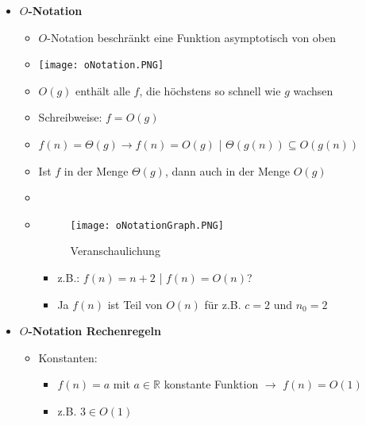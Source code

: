 \begin{itemize}
        \item \textbf{$O$-Notation}
            \begin{itemize}
                \item $O$-Notation beschränkt eine Funktion asymptotisch von oben
                \item[] \texttt{[image: oNotation.PNG]}
                \item $O(g)$ enthält alle $f$, die höchstens so schnell wie $g$ wachsen
                \item Schreibweise: $f=O(g)$
                \item $f(n)=\Theta(g) \rightarrow f(n) = O(g)$ | $\Theta(g(n)) \subseteq O(g(n))$
                \item Ist $f$ in der Menge $\Theta(g)$, dann auch in der Menge $O(g)$
                \item[]
                \item[] 
                    \begin{minipage}{0.3\textwidth}
                    \begin{figure}[H]
                        \centering
                        \texttt{[image: oNotationGraph.PNG]}
                        \caption{Veranschaulichung}
                        \label{}
                    \end{figure}
                    \end{minipage}
                    \begin{minipage}[t]{0.6\textwidth}
                    \vspace{-3cm}
                        \begin{itemize}
                            \item z.B.: $f(n) = n + 2$ | $f(n) = O(n)$?
                            \item Ja $f(n)$ ist Teil von $O(n)$ für z.B. $c = 2$ und $n_0 = 2$
                        \end{itemize}
                    \end{minipage}
            \end{itemize}
        
        \item \textbf{$O$-Notation Rechenregeln}
            \begin{itemize}
                \item Konstanten: 
                    \begin{itemize}
                        \item $f(n) = a$ mit $a \in \mathbb{R}$ konstante Funktion $\rightarrow$ $f(n) = O(1)$
                        \item z.B. $3 \in O(1)$
                    \end{itemize}
                

\end{itemize}
\end{itemize}
